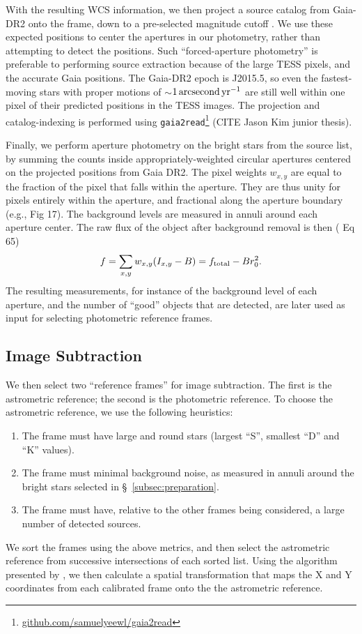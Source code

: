\documentclass[12pt,twocolumn,tighten]{aastex62}
\begin{document}
With the resulting WCS information, we then project a source catalog
from Gaia-DR2 onto the frame, down to a pre-selected magnitude cutoff
\citep{gaia_collaboration_gaia_2018}.  We use these expected positions
to center the apertures in our photometry, rather than attempting to
detect the positions.  Such ``forced-aperture photometry'' is
preferable to performing source extraction because of the large TESS
pixels, and the accurate Gaia positions.  The Gaia-DR2 epoch is
J2015.5, so even the fastest-moving stars with proper motions of
$\sim$$1\,{\rm arcsecond}\,{\rm yr}^{-1}$ are still well within one pixel
of their predicted positions in the TESS images.  The projection and
catalog-indexing is performed using
\texttt{gaia2read}\footnote{\url{github.com/samuelyeewl/gaia2read}}
(CITE Jason Kim junior thesis).

Finally, we perform aperture photometry on the bright stars from the
source list, by summing the counts inside appropriately-weighted
circular apertures centered on the projected positions from Gaia DR2. 
The pixel weights $w_{x,y}$ are equal to the fraction of the pixel
that falls within the aperture.  They are thus unity for pixels
entirely within the aperture, and fractional along the aperture
boundary (e.g., \citealt{Pal_2009} Fig 17). 
The background levels are measured in annuli around each aperture
center.  The raw flux of the object after background removal is then
(\citealt{Pal_2009} Eq 65)
\begin{equation}
  f = \sum_{x,y} w_{x,y} (I_{x,y} - B) = f_{\rm total} - B r_0^2.
  \label{eq:simple_aperture_phot}
\end{equation}
The resulting measurements, for instance of the background level of
each aperture, and the number of ``good'' objects that are detected,
are later used as input for selecting photometric reference frames.


\subsection{Image Subtraction}
\label{subsec:imagesubtraction}

We then select two ``reference frames'' for image subtraction.
The first is the astrometric reference; the second is the photometric
reference.
To choose the astrometric reference, we use the following heuristics:
\begin{enumerate}
  \item The frame must have large and round stars (largest ``S'',
    smallest ``D'' and ``K'' values).
  \item The frame must minimal background noise, as measured in annuli
    around the bright stars selected in \S~\ref{subsec:preparation}.
  \item The frame must have, relative to the other frames being
    considered, a large number of detected sources.
\end{enumerate}
We sort the frames using the above metrics, and then select the
astrometric reference from successive intersections of each sorted
list.
Using the algorithm presented by \citet{pal_astrometry_2006}, we then
calculate a spatial transformation that maps the X and Y coordinates
from each calibrated frame onto the the astrometric reference.
\end{document}
